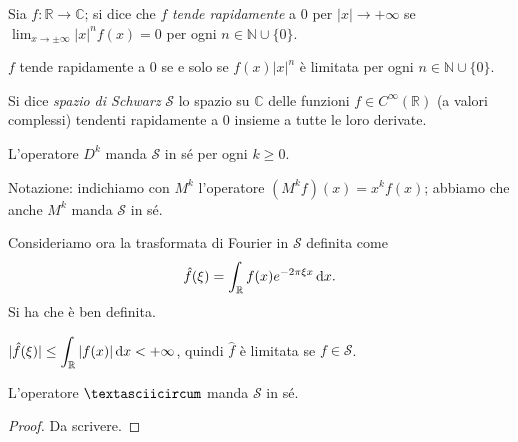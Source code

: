 \begin{defn}
  Sia $f:\mathbb{R} \longrightarrow \mathbb{C}$; si dice che $f$ \textit{tende rapidamente} a $0$ per $|x| \longrightarrow +\infty$ se $\displaystyle \lim_{x \longrightarrow \pm \infty} |x|^nf(x)=0$ per ogni $n \in \mathbb{N}\cup\{0\}$.
\end{defn}

\begin{oss}
  $f$ tende rapidamente a $0$ se e solo se $f(x)|x|^n$ è limitata per ogni $n \in \mathbb{N}\cup\{0\}$.
\end{oss}

\begin{defn}
  Si dice \textit{spazio di Schwarz} $\mathcal{S}$ lo spazio su $\mathbb{C}$ delle funzioni $f \in C^{\infty}(\mathbb{R})$ (a valori complessi) tendenti rapidamente a $0$ insieme a tutte le loro derivate.
\end{defn}

\begin{oss}
  L'operatore $D^k$ manda $\mathcal{S}$ in sé per ogni $k \ge 0$.
\end{oss}

Notazione: indichiamo con $M^k$ l'operatore $(M^kf)(x)=x^kf(x)$; abbiamo che anche $M^k$ manda $\mathcal{S}$ in sé.

Consideriamo ora la trasformata di Fourier in $\mathcal{S}$ definita come
$$\hat{f}(\xi)=\int_{\mathbb{R}} f(x)e^{-2\pi\xi x}\mathop{}\!\mathrm{d} x.$$
Si ha che è ben definita.

\begin{oss}
  $\displaystyle |\hat{f}(\xi)| \le \int_{\mathbb{R}} |f(x)|\mathop{}\!\mathrm{d} x<+\infty$, quindi $\hat{f}$ è limitata se $f \in \mathcal{S}$.
\end{oss}

\begin{lm}
  L'operatore $\textasciicircum$ manda $\mathcal{S}$ in sé.
\end{lm}

\begin{proof}
  Da scrivere.
\end{proof}
